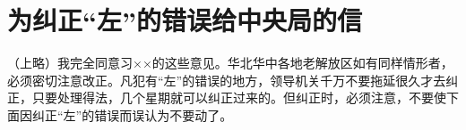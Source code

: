 \section[为纠正“左”的错误给中央局的信（一九四八年一月二十日）]{为纠正“左”的错误给中央局的信}


（上略）我完全同意习××的这些意见。华北华中各地老解放区如有同样情形者，必须密切注意改正。凡犯有“左”的错误的地方，领导机关千万不要拖延很久才去纠正，只要处理得法，几个星期就可以纠正过来的。但纠正时，必须注意，不要使下面因纠正“左”的错误而误认为不要动了。

